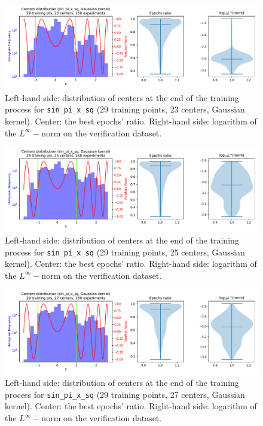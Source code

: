 \documentclass[12pt]{report} %
\begin{document}
\begin{figure}[ht]
  \centering
  \includegraphics[width=\textwidth]
  {imagenes/experiments/1d/sin_pi_x_sq_statistic_interpolation/tr29_c23_sin_pi_x_sq_gaussian_kernel.pdf}
  \caption{Left-hand side: distribution of centers at the end of the training process for
    \texttt{sin\_pi\_x\_sq} (29 training points, 23 centers, Gaussian kernel). Center: the best epochs' ratio.
    Right-hand side: logarithm of the $L^\infty-$norm on the verification dataset.}
  \label{fig:sin-pi-x-sq-statistic-tr29-c23}
\end{figure}

\begin{figure}[ht]
  \centering
  \includegraphics[width=\textwidth]
  {imagenes/experiments/1d/sin_pi_x_sq_statistic_interpolation/tr29_c25_sin_pi_x_sq_gaussian_kernel.pdf}
  \caption{Left-hand side: distribution of centers at the end of the training process for
    \texttt{sin\_pi\_x\_sq} (29 training points, 25 centers, Gaussian kernel). Center: the best epochs' ratio.
    Right-hand side: logarithm of the $L^\infty-$norm on the verification dataset.}
  \label{fig:sin-pi-x-sq-statistic-tr29-c25}
\end{figure}

\begin{figure}[ht]
  \centering
  \includegraphics[width=\textwidth]
  {imagenes/experiments/1d/sin_pi_x_sq_statistic_interpolation/tr29_c27_sin_pi_x_sq_gaussian_kernel.pdf}
  \caption{Left-hand side: distribution of centers at the end of the training process for
    \texttt{sin\_pi\_x\_sq} (29 training points, 27 centers, Gaussian kernel). Center: the best epochs' ratio.
    Right-hand side: logarithm of the $L^\infty-$norm on the verification dataset.}
  \label{fig:sin-pi-x-sq-statistic-tr29-c27}
\end{figure}
\end{document}
